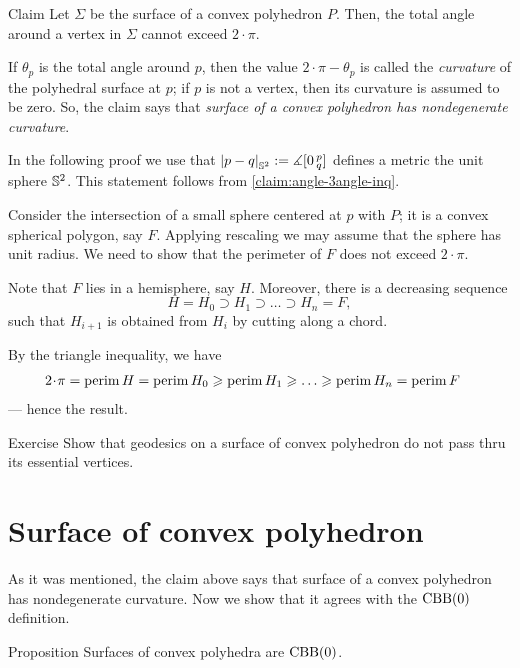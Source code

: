 \begin{thm}{Claim}\label{clm:total-angle}
Let $\Sigma$ be the surface of a convex polyhedron $P$.
Then, the total angle around a vertex in $\Sigma$ cannot exceed $2\cdot\pi$.
\end{thm} 

If $\theta_p$ is the total angle around $p$, then the value $2\cdot \pi -\theta_p$ is called the \emph{curvature} of the polyhedral surface at $p$;
if $p$ is not a vertex, then its curvature is assumed to be zero.
So, the claim says that \textit{surface of a convex polyhedron has nondegenerate curvature}.

In the following proof we use that $\dist{p}{q}{\SSS^2}\df \mangle\hinge 0pq$ defines a metric the unit sphere $\mathbb{S}^2$.
This statement follows from \ref{claim:angle-3angle-inq}.

Consider the intersection of a small sphere centered at $p$ with $P$;
it is a convex spherical polygon, say $F$.
Applying rescaling we may assume that the sphere has unit radius.
We need to show that the perimeter of $F$ does not exceed $2\cdot\pi$.

Note that $F$ lies in a hemisphere, say $H$.
Moreover, there is a decreasing sequence 
\[H=H_0\supset H_1\supset\dots\supset H_n=F,\]
such that $H_{i+1}$ is obtained from $H_{i}$ by cutting along a chord.

By the triangle inequality, we have
\begin{align*}
2\cdot\pi=\perim H=\perim H_0&\ge\perim H_1\ge\dots\ge\perim H_n=\perim F
\end{align*}
--- hence the result.
\qedsf

\begin{thm}{Exercise}\label{ex:geodesic-vertex}
Show that geodesics on a surface of convex polyhedron do not pass thru its essential vertices.
\end{thm}

\section{Surface of convex polyhedron}

As it was mentioned,
the claim above says that surface of a convex polyhedron has nondegenerate curvature.
Now we show that it agrees with the $\mathrm{CBB}(0)$ definition.

\begin{thm}{Proposition}\label{prop:poly-CBB}
Surfaces of convex polyhedra are $\mathrm{CBB}(0)$.
\end{thm}

